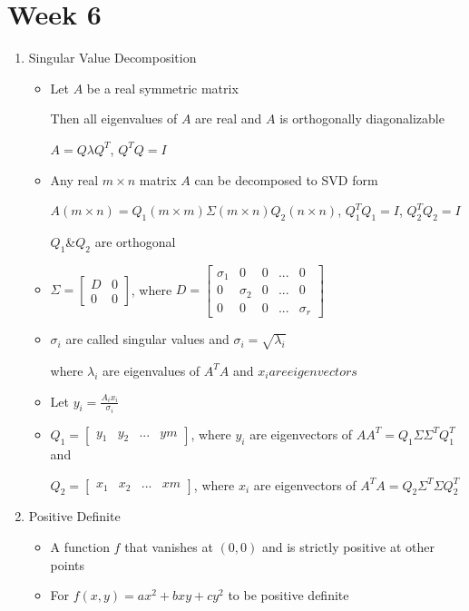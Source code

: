 \documentclass[a4paper]{article}
\begin{document}
\section{Week 6}
	\begin{enumerate}
		\item Singular Value Decomposition
		\begin{itemize}
			\item Let $A$ be a real symmetric matrix
			
			Then all eigenvalues of $A$ are real and $A$ is orthogonally diagonalizable
			
			$A = Q\lambda Q^{T}$, $Q^{T}Q = I$
			\item Any real $m\times n$ matrix $A$ can be decomposed to SVD form
			
			$A(m\times n) = Q_{1}(m\times m)\Sigma (m\times n)Q_{2}(n\times n)$, $Q_{1}^{T}Q_{1} = I$, $Q_{2}^{T}Q_{2} = I$
			
			$Q_{1}$\&$Q_{2}$ are orthogonal
			\item $\Sigma = \begin{bmatrix}D&0\\
			0&0\end{bmatrix}$, where $D = \begin{bmatrix}\sigma_{1}&0&0&...&0\\
			0&\sigma_{2}&0&...&0\\
			0&0&0&...&\sigma_{r}\end{bmatrix}$
			\item $\sigma_{i}$ are called singular values and $\sigma_{i} = \sqrt{\lambda_{i}}$
			
			where $\lambda_{i}$ are eigenvalues of $A^{T}A$ and $x_{i} are eigenvectors$
			\item Let $y_{i} = \frac{A_{i}x_{i}}{\sigma_{i}}$
			\item $Q_{1} = \begin{bmatrix}y_{1}&y_{2}&...&y{m}\end{bmatrix}$, where $y_{i}$ are eigenvectors of $AA^{T} = Q_{1}\Sigma \Sigma^{T}Q_{1}^{T}$ and
			
			$Q_{2} = \begin{bmatrix}x_{1}&x_{2}&...&x{m}\end{bmatrix}$, where $x_{i}$ are eigenvectors of $A^{T}A = Q_{2}\Sigma^{T}\Sigma Q_{2}^{T}$
		\end{itemize}
		\item Positive Definite
		\begin{itemize}
			\item A function $f$ that vanishes at $(0,0)$ and is strictly positive at other points
			\item For $f(x,y) = ax^{2} + bxy + cy^{2}$ to be positive definite
			

\end{itemize}
\end{enumerate}
\end{document}
